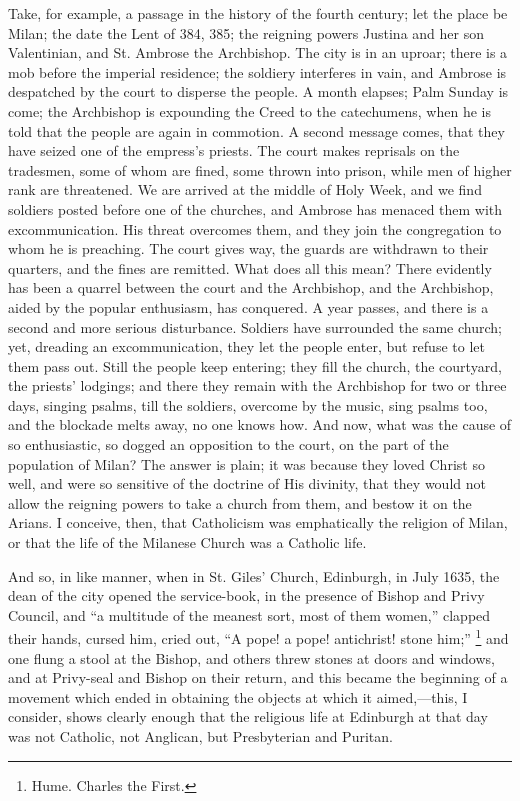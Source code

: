 Take, for example, a passage in the history of the fourth century;
let the place be Milan; the date the Lent of 384, 385; the reigning
powers Justina and her son Valentinian, and St. Ambrose the
Archbishop. The city is in an uproar; there is a mob before the
imperial residence; the soldiery interferes in vain, and Ambrose is
despatched by the court to disperse the people. A month elapses; Palm
Sunday is come; the Archbishop is expounding the Creed to the
catechumens, when he is told that the people are again in commotion. A
second message comes, that they have seized one of the empress's
priests. The court makes reprisals on the tradesmen, some of whom are
fined, some thrown into prison, while men of higher rank are
threatened. We are arrived at the middle of Holy Week, and we find
soldiers posted before one of the churches, and Ambrose has menaced
them with excommunication. His threat overcomes them, and they join
the congregation to whom he is preaching. The court gives way, the
guards are withdrawn to their quarters, and the fines are remitted.
What does all this mean? There evidently has been a quarrel between
the court and the Archbishop, and the Archbishop, aided by the popular
enthusiasm, has conquered. A year passes, and there is a second and
more serious disturbance. Soldiers have surrounded the same church;
yet, dreading an excommunication, they let the people enter, but
refuse to let them pass out. Still the people keep entering; they fill
the church, the courtyard, the priests' lodgings; and there they
remain with the Archbishop for two or three days, singing psalms, till
the soldiers, overcome by the music, sing psalms too, and the blockade
melts away, no one knows how. And now, what was the cause of so
enthusiastic, so dogged an opposition to the court, on the part of the
population of Milan? The answer is plain; it was because they loved
Christ so well, and were so sensitive of the doctrine of His divinity,
that they would not allow the reigning powers to take a church from
them, and bestow it on the Arians. I conceive, then, that Catholicism
was emphatically the religion of Milan, or that the life of the
Milanese Church was a Catholic life.

And so, in like manner, when in St. Giles' Church, Edinburgh, in
July 1635, the dean of the city opened the service-book, in the
presence of Bishop and Privy Council, and ``a multitude of the
meanest sort, most of them women,'' clapped their hands, cursed
him, cried out, ``A pope! a pope! antichrist! stone him;'' \footnote{Hume. Charles the First.} and one flung a stool at the Bishop, and others threw stones
at doors and windows, and at Privy-seal and Bishop on their return,
and this became the beginning of a movement which ended in obtaining
the objects at which it aimed,—this, I consider, shows clearly
enough that the religious life at Edinburgh at that day was not
Catholic, not Anglican, but Presbyterian and Puritan.

